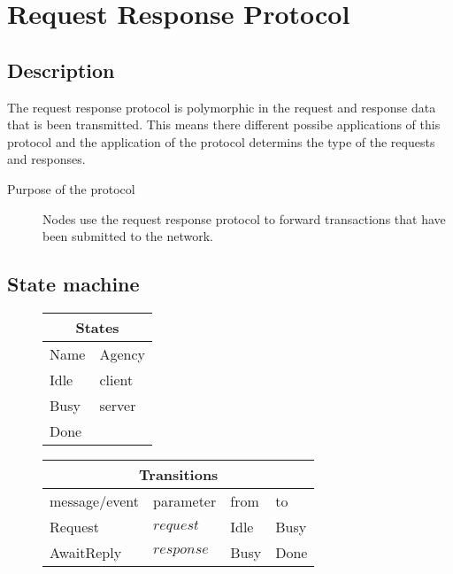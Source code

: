 \documentclass{report}
\newcommand{\hsref}[1]{} %
\newcommand{\wip}[1]{\color{magenta}{#1}\color{black}}
\theoremstyle{definition}{
  \newtheorem{lemma}{Lemma}[section] %
  \newtheorem{definition}[lemma]{Definition}
}
\theoremstyle{theorem}{
  \newtheorem{invariant}[lemma]{Invariant}
  \newtheorem{proofobligation}[lemma]{Proof Obligation}
}
\numberwithin{equation}{lemma}
\begin{document}
\wip{Todo implement: CBOR codec for block fetch}

\section{Request Response Protocol}
\label{request-response-protocol}
\subsection{Description}
The request response protocol is polymorphic in the request and response data that is been transmitted.
This means there different possibe applications of this protocol and the
application of the protocol determins the type of the requests and responses.

\begin{description}
\item[Purpose of the protocol]
  Nodes use the request response protocol to forward transactions that have been
  submitted to the network.
\end{description}

\subsection{State machine}
\hsref{ouroboros-network/src/Ouroboros/Network/Protocol/ReqResp/Type.hs}
\begin{figure}[H]
\begin{tabular}{|l|l|}
  \hline
  \multicolumn{2}{|c|}{States} \\ \hline
  Name  & Agency \\ \hline \hline
  Idle       & client \\ \hline
  Busy   & server \\ \hline
  Done       &        \\ \hline
  \hline
\end{tabular}
\end{figure}

\begin{figure}[H]
\begin{tabular}{|l|l|l|l|}
  \hline
  \multicolumn{4}{|c|}{Transitions} \\ \hline
  message/event      & parameter              & from        & to       \\ \hline\hline
  Request            & $request$              & Idle        & Busy      \\ \hline
  AwaitReply         & $response$             & Busy        & Done \\ \hline
\end{tabular}
\end{figure}
\end{document}
